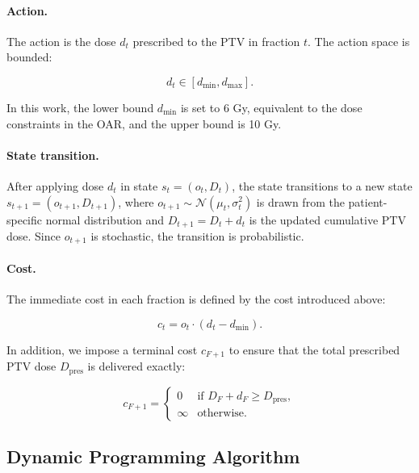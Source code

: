 \documentclass[11pt]{article}
\begin{document}
\paragraph{Action.}
The action is the dose $d_t$ prescribed to the PTV in fraction $t$. The action space is bounded:

\begin{equation}
d_t \in [d_{\min}, d_{\max}].
\label{eq:action-space-overlap}
\end{equation}

In this work, the lower bound $d_{\min}$ is set to 6 Gy, equivalent to the dose constraints in the OAR, and the upper bound is 10 Gy.

\paragraph{State transition.}
After applying dose $d_t$ in state $s_t = (o_t, D_t)$, the state transitions to a new state $s_{t+1} = (o_{t+1}, D_{t+1})$, where $o_{t+1} \sim \mathcal{N}(\mu_t,\sigma_t^2)$ is drawn from the patient-specific normal distribution and $D_{t+1} = D_t + d_t$ is the updated cumulative PTV dose. Since $o_{t+1}$ is stochastic, the transition is probabilistic.

\paragraph{Cost.}
The immediate cost in each fraction is defined by the cost introduced above:

\begin{equation}
c_t = o_t \cdot (d_t - d_{\min}).
\label{eq:immediate-cost-overlap}
\end{equation}

In addition, we impose a terminal cost $c_{F+1}$ to ensure that the total prescribed PTV dose $D_{\mathrm{pres}}$ is delivered exactly:

\begin{equation}
c_{F+1} =
\begin{cases}
0 & \text{if } D_F + d_F \geq D_{\mathrm{pres}}, \\
\infty & \text{otherwise.}
\end{cases}
\label{eq:terminal-cost-overlap}
\end{equation}

\subsection{Dynamic Programming Algorithm}
\end{document}
